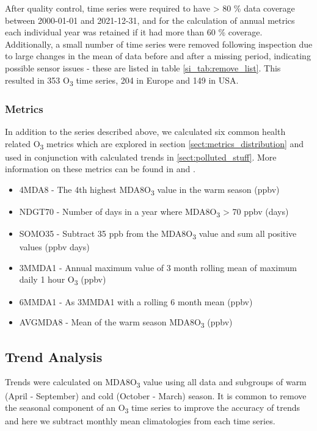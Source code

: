 \documentclass[journal abbreviation, manuscript]{copernicus}
\begin{document}
After quality control, time series were required to have > 80 \% data coverage between 2000-01-01 and 2021-12-31, and for the calculation of annual metrics each individual year was retained if it had more than 60 \% coverage. Additionally, a small number of time series were removed following inspection due to large changes in the mean of data before and after a missing period, indicating possible sensor issues - these are listed in table \ref{si_tab:remove_list}. This resulted in 353 O\textsubscript{3} time series, 204 in Europe and 149 in USA. 

\subsubsection{Metrics}

In addition to the series described above, we calculated six common health related O\textsubscript{3} metrics which are explored in section \ref{sect:metrics_distribution} and used in conjunction with calculated trends in \ref{sect:polluted_stuff}. More information on these metrics can be found in \cite{10.1525/elementa.279} and \cite{fleming_2018}.

\begin{itemize}
    \item 4MDA8 - The 4th highest MDA8O\textsubscript{3} value in the warm season (ppbv)
    \item NDGT70 - Number of days in a year where MDA8O\textsubscript{3} > 70 ppbv (days)
    \item SOMO35 - Subtract 35 ppb from the MDA8O\textsubscript{3} value and sum all positive values (ppbv days)
    \item 3MMDA1 - Annual maximum value of 3 month rolling mean of maximum daily 1 hour O\textsubscript{3} (ppbv)
    \item 6MMDA1 - As 3MMDA1 with a rolling 6 month mean (ppbv)
    \item AVGMDA8 - Mean of the warm season MDA8O\textsubscript{3} (ppbv)
\end{itemize}

\subsection{Trend Analysis}

Trends were calculated on MDA8O\textsubscript{3} value using all data and subgroups of warm (April - September) and cold (October - March) season. It is common to remove the seasonal component of an O\textsubscript{3} time series to improve the accuracy of trends \citep{cooper_2020} and here we subtract monthly mean climatologies from each time series. 
\end{document}
